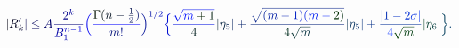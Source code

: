 \documentclass[12pt]{article}
\begin{document}
\makeatletter
\renewcommand*{\@textcolor}[3]{%
  \protect\leavevmode
  \begingroup
    \color#1{#2}#3%
  \endgroup
}
\makeatother
\begin{displaymath}
\mathcolor[RGB]{0,0,15}{|} \mathcolor[RGB]{0,0,30}{R} _ { \mathcolor[RGB]{0,0,45}{k} } ^ { \mathcolor[RGB]{0,0,60}{\prime} } \mathcolor[RGB]{0,0,75}{|} \mathcolor[RGB]{0,0,90}{\leq} \mathcolor[RGB]{0,0,105}{A} \mathcolor[RGB]{0,0,120}{\frac { \mathcolor[RGB]{0,0,135}{2} ^ { \mathcolor[RGB]{0,0,150}{k} } } { \mathcolor[RGB]{0,0,165}{B} _ { \mathcolor[RGB]{0,0,180}{1} } ^ { \mathcolor[RGB]{0,0,195}{n} \mathcolor[RGB]{0,0,210}{-} \mathcolor[RGB]{0,0,225}{1} } } } \mathcolor[RGB]{0,0,240}{\Big(} \mathcolor[RGB]{0,0,255}{\frac { \mathcolor[RGB]{0,15,0}{\Gamma} \mathcolor[RGB]{0,15,15}{(} \mathcolor[RGB]{0,15,30}{n} \mathcolor[RGB]{0,15,45}{-} \mathcolor[RGB]{0,15,60}{\frac { \mathcolor[RGB]{0,15,75}{1} } { \mathcolor[RGB]{0,15,90}{2} } } \mathcolor[RGB]{0,15,105}{)} } { \mathcolor[RGB]{0,15,120}{m} \mathcolor[RGB]{0,15,135}{!} } } \mathcolor[RGB]{0,15,150}{\Big)} ^ { \mathcolor[RGB]{0,15,165}{1} \mathcolor[RGB]{0,15,180}{/} \mathcolor[RGB]{0,15,195}{2} } \mathcolor[RGB]{0,15,210}{\Big\{} \mathcolor[RGB]{0,15,225}{\frac { \mathcolor[RGB]{0,15,240}{\sqrt { \mathcolor[RGB]{0,15,255}{m} \mathcolor[RGB]{0,30,0}{+} \mathcolor[RGB]{0,30,15}{1} } } } { \mathcolor[RGB]{0,30,30}{4} } } \mathcolor[RGB]{0,30,45}{\vert} \mathcolor[RGB]{0,30,60}{\eta} _ { \mathcolor[RGB]{0,30,75}{5} } \mathcolor[RGB]{0,30,90}{\vert} \mathcolor[RGB]{0,30,105}{+} \mathcolor[RGB]{0,30,120}{\frac { \mathcolor[RGB]{0,30,135}{\sqrt { \mathcolor[RGB]{0,30,150}{(} \mathcolor[RGB]{0,30,165}{m} \mathcolor[RGB]{0,30,180}{-} \mathcolor[RGB]{0,30,195}{1} \mathcolor[RGB]{0,30,210}{)} \mathcolor[RGB]{0,30,225}{(} \mathcolor[RGB]{0,30,240}{m} \mathcolor[RGB]{0,30,255}{-} \mathcolor[RGB]{0,45,0}{2} \mathcolor[RGB]{0,45,15}{)} } } } { \mathcolor[RGB]{0,45,30}{4} \mathcolor[RGB]{0,45,45}{\sqrt { \mathcolor[RGB]{0,45,60}{m} } } } } \mathcolor[RGB]{0,45,75}{\vert} \mathcolor[RGB]{0,45,90}{\eta} _ { \mathcolor[RGB]{0,45,105}{5} } \mathcolor[RGB]{0,45,120}{\vert} \mathcolor[RGB]{0,45,135}{+} \mathcolor[RGB]{0,45,150}{\frac { \mathcolor[RGB]{0,45,165}{\vert} \mathcolor[RGB]{0,45,180}{1} \mathcolor[RGB]{0,45,195}{-} \mathcolor[RGB]{0,45,210}{2} \mathcolor[RGB]{0,45,225}{\sigma} \mathcolor[RGB]{0,45,240}{\vert} } { \mathcolor[RGB]{0,45,255}{4} \mathcolor[RGB]{0,60,0}{\sqrt { \mathcolor[RGB]{0,60,15}{m} } } } } \mathcolor[RGB]{0,60,30}{\vert} \mathcolor[RGB]{0,60,45}{\eta} _ { \mathcolor[RGB]{0,60,60}{6} } \mathcolor[RGB]{0,60,75}{\vert} \mathcolor[RGB]{0,60,90}{\Big\}} \mathcolor[RGB]{0,60,105}{.}
\end{displaymath}
\end{document}
